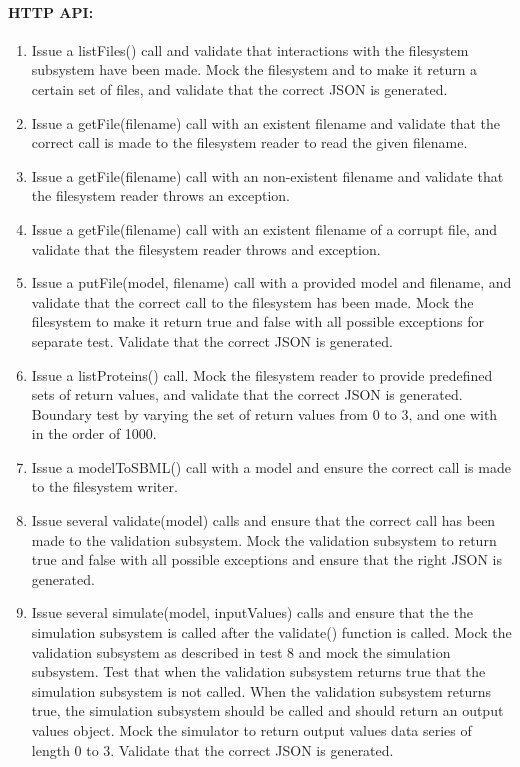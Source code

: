 \paragraph{HTTP API:
}\begin{enumerate}
\item Issue a listFiles() call and validate that interactions with the filesystem subsystem have been made. Mock the filesystem and to make it return a certain set of files, and validate that the correct JSON is generated.
\item Issue a getFile(filename) call with an existent filename and validate that the correct call is made to the filesystem reader to read the given filename.
\item Issue a getFile(filename) call with an non-existent filename and validate that the filesystem reader throws an exception.
\item Issue a getFile(filename) call with an existent filename of a corrupt file, and validate that the filesystem reader throws and exception.
\item Issue a putFile(model, filename) call with a provided model and filename, and validate  that the correct call to the filesystem has been made. Mock the filesystem to make it return true and false with all possible exceptions for separate test. Validate that the correct JSON is generated.\item Issue a listProteins() call. Mock the filesystem reader to provide predefined sets of return values, and validate that the correct JSON is generated. Boundary test by varying the set of return values from 0 to 3, and one with in the order of 1000. \item Issue a modelToSBML() call with a model and ensure the correct call is made to the filesystem writer.\item Issue several validate(model) calls and ensure that the correct call has been made to the validation subsystem. Mock the validation subsystem to return true and false with all possible exceptions and ensure that the right JSON is generated.
\item Issue several simulate(model, inputValues) calls and ensure that the the simulation subsystem is called after the validate() function is called. Mock the validation subsystem as described in test 8 and mock the simulation subsystem. Test that when the validation subsystem returns true that the simulation subsystem is not called. When the validation subsystem returns true, the simulation subsystem should be called and should return an output values object. Mock the simulator to return output values data series of length 0 to 3. Validate that the correct JSON is generated.\end{enumerate}
